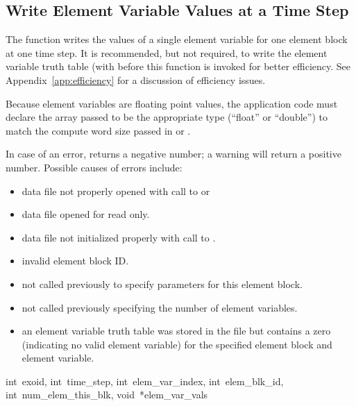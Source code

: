 \subsection{Write Element Variable Values at a Time Step}

The function  writes the values of a single
element variable for one element block at one time step. It is
recommended, but not required, to write the element variable truth
table (with  before this function is
invoked for better efficiency. See Appendix~\ref{app:efficiency} for a
discussion of efficiency issues.

Because element variables are floating point values, the application
code must declare the array passed to be the appropriate type
(``float'' or ``double'') to match the compute word size passed in
 or .


In case of an error,  returns a negative
number; a warning will return a positive number.  Possible causes of
errors include:

\begin{itemize}
 \item data file not properly opened with call to 
 or 

 \item data file opened for read only.

 \item data file not initialized properly with call to
 .

 \item invalid element block ID.

 \item {} not called previously to specify
 parameters for this element block.

 \item {} not called previously specifying
 the number of element variables.

 \item an element variable truth table was stored in the file but
 contains a zero (indicating no valid element variable) for the
 specified element block and element variable.
\end{itemize}



{int~exoid,
int~time_step,
int~elem_var_index,
int~elem_blk_id,
int~num_elem_this_blk,
void~*elem_var_vals}

